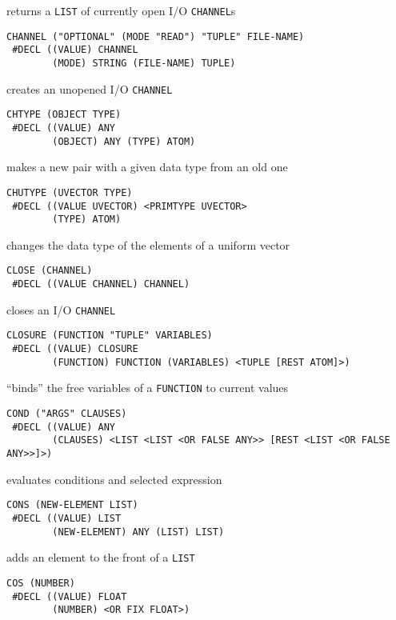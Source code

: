 \documentclass[a4paper,]{article}
\begin{document}
returns a \texttt{LIST} of currently open I/O \texttt{CHANNEL}s

\begin{verbatim}
CHANNEL ("OPTIONAL" (MODE "READ") "TUPLE" FILE-NAME)
 #DECL ((VALUE) CHANNEL
        (MODE) STRING (FILE-NAME) TUPLE)
\end{verbatim}

creates an unopened I/O \texttt{CHANNEL}

\begin{verbatim}
CHTYPE (OBJECT TYPE)
 #DECL ((VALUE) ANY
        (OBJECT) ANY (TYPE) ATOM)
\end{verbatim}

makes a new pair with a given data type from an old one

\begin{verbatim}
CHUTYPE (UVECTOR TYPE)
 #DECL ((VALUE UVECTOR) <PRIMTYPE UVECTOR>
        (TYPE) ATOM)
\end{verbatim}

changes the data type of the elements of a uniform vector

\begin{verbatim}
CLOSE (CHANNEL)
 #DECL ((VALUE CHANNEL) CHANNEL)
\end{verbatim}

closes an I/O \texttt{CHANNEL}

\begin{verbatim}
CLOSURE (FUNCTION "TUPLE" VARIABLES)
 #DECL ((VALUE) CLOSURE
        (FUNCTION) FUNCTION (VARIABLES) <TUPLE [REST ATOM]>)
\end{verbatim}

``binds'' the free variables of a \texttt{FUNCTION} to current values

\begin{verbatim}
COND ("ARGS" CLAUSES)
 #DECL ((VALUE) ANY
        (CLAUSES) <LIST <LIST <OR FALSE ANY>> [REST <LIST <OR FALSE ANY>>]>)
\end{verbatim}

evaluates conditions and selected expression

\begin{verbatim}
CONS (NEW-ELEMENT LIST)
 #DECL ((VALUE) LIST
        (NEW-ELEMENT) ANY (LIST) LIST)
\end{verbatim}

adds an element to the front of a \texttt{LIST}

\begin{verbatim}
COS (NUMBER)
 #DECL ((VALUE) FLOAT
        (NUMBER) <OR FIX FLOAT>)
\end{verbatim}
\end{document}
